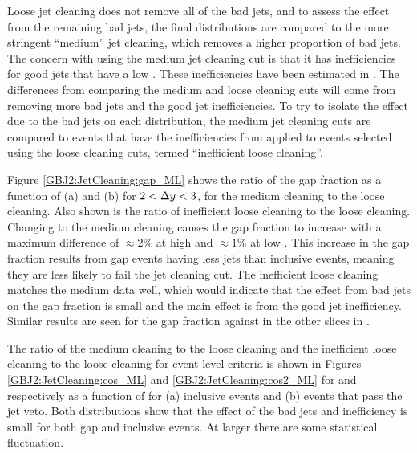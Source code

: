 Loose jet cleaning does not remove all of the bad jets, and to assess the effect from the remaining bad jets, the final distributions are compared to the more stringent ``medium'' jet cleaning, which  removes a higher proportion of bad jets. 
The concern with using the medium jet cleaning cut is that it has inefficiencies for good jets that have a low \pt{}.
These inefficiencies have been estimated in \cite{ref:JES}.
The differences from comparing the medium and loose cleaning cuts will come from removing more bad jets and the good jet inefficiencies.
To try to isolate the effect due to the bad jets on each distribution, the medium jet cleaning cuts are compared to events that have the inefficiencies from \cite{ref:JES} applied to events selected using the loose cleaning cuts, termed ``inefficient loose cleaning''. 


Figure \ref{GBJ2:JetCleaning:gap_ML} shows the ratio of the gap fraction as a function of (a) \dy{} and (b) \qz{} for  $2<\mbox{$\Delta y$}{}<3$,  for the medium cleaning to the loose cleaning.
Also shown is the ratio of inefficient loose cleaning to the loose cleaning.
Changing to the medium cleaning causes the gap fraction to increase with a maximum difference of $\approx 2\%$ at high \dy{} and $\approx 1\%$ at low \qz{}.
This increase in the gap fraction results from gap events having less jets than inclusive events, meaning they are less likely to fail the jet cleaning cut. 
The inefficient loose cleaning matches the medium data well, which would indicate that the effect from bad jets on the gap fraction is small and the main effect is from the good jet inefficiency. 
Similar results are seen for the gap fraction against \qz{} in the other slices in \dy{}.  


The ratio of the medium cleaning to the loose cleaning and the inefficient loose cleaning to the loose cleaning for event-level criteria is shown in Figures \ref{GBJ2:JetCleaning:cos_ML} and \ref{GBJ2:JetCleaning:cos2_ML} for \mean{\cosdphi{}} and \mean{\costwodphi{}} respectively as a function of \dy{} for (a) inclusive events and (b) events that pass the jet veto. 
Both distributions show that the effect of the bad jets and inefficiency is small for both gap and inclusive events.
At larger \dy{} there are some statistical fluctuation.

